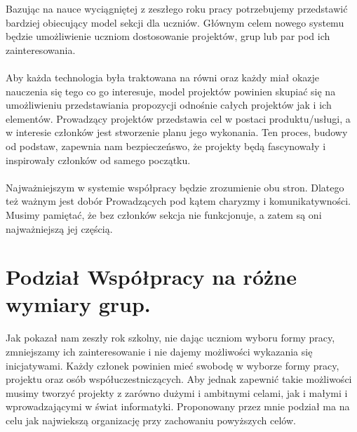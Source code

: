 \documentclass[9pt,a4paper]{report}
\begin{document}
Bazując na nauce wyciągniętej z zeszłego roku pracy potrzebujemy przedstawić bardziej obiecujący model sekcji dla uczniów. Głównym celem nowego systemu będzie umożliwienie uczniom dostosowanie projektów, grup lub par pod ich zainteresowania.\\\\
Aby każda technologia była traktowana na równi oraz każdy miał okazje nauczenia się tego co go interesuje, model projektów powinien skupiać się na umożliwieniu przedstawiania propozycji odnośnie całych projektów jak i ich elementów. Prowadzący projektów przedstawia cel w postaci produktu/usługi, a w interesie członków jest stworzenie planu jego wykonania. Ten proces, budowy od podstaw, zapewnia nam bezpieczeńswo, że projekty będą fascynowały i inspirowały członków od samego początku.\\\\
Najważniejszym w systemie współpracy będzie zrozumienie obu stron. Dlatego też ważnym jest dobór Prowadzących pod kątem charyzmy i komunikatywności. Musimy pamiętać, że bez członków sekcja nie funkcjonuje, a zatem są oni najważniejszą jej częścią.

\section{Podział Współpracy na różne wymiary grup.}

Jak pokazał nam zeszły rok szkolny, nie dając uczniom wyboru formy pracy, zmniejszamy ich zainteresowanie i nie dajemy możliwości wykazania się inicjatywami. Każdy członek powinien mieć swobodę w wyborze formy pracy, projektu oraz osób współuczestniczących. Aby jednak zapewnić takie możliwości musimy tworzyć projekty z zarówno dużymi i ambitnymi celami, jak i małymi i wprowadzającymi w świat informatyki. Proponowany przez mnie podział ma na celu jak najwiekszą organizację przy zachowaniu powyższych celów.\\\\
\end{document}
